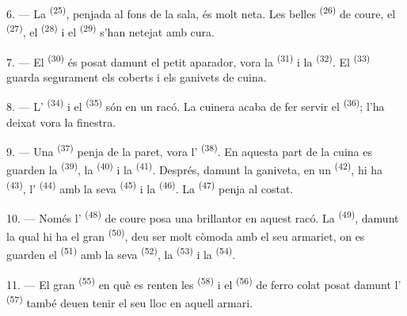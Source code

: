 \VUsaut{4.0mm}
\VUsaut{3.0mm}

6. --- La  \textsuperscript{(25)}, penjada al fons de la sala, és
molt neta. Les belles  \textsuperscript{(26)} de coure, el 
\textsuperscript{(27)}, el  \textsuperscript{(28)} i el 
\textsuperscript{(29)} s'han netejat amb cura.

7. --- El  \textsuperscript{(30)} és posat damunt el petit aparador, vora la
 \textsuperscript{(31)} i la 
\textsuperscript{(32)}. El  \textsuperscript{(33)} guarda segurament els
coberts i els ganivets de cuina.

8. --- L' \textsuperscript{(34)} i el  \textsuperscript{(35)}
són en un racó. La cuinera acaba de fer servir el
 \textsuperscript{(36)}; l'ha deixat vora la finestra.

9. --- Una  \textsuperscript{(37)} penja de la paret, vora
l' \textsuperscript{(38)}. En aquesta part de la cuina es guarden la
 \textsuperscript{(39)}, la  \textsuperscript{(40)}
i la  \textsuperscript{(41)}. Després, damunt la ganiveta, en un
 \textsuperscript{(42)}, hi ha 
\textsuperscript{(43)}, l' \textsuperscript{(44)} amb la seva 
\textsuperscript{(45)} i la
 \textsuperscript{(46)}. La 
\textsuperscript{(47)} penja al costat.

10. --- Només l' \textsuperscript{(48)} de coure posa una brillantor en aquest
racó. La  \textsuperscript{(49)}, damunt la qual hi ha el gran 
\textsuperscript{(50)}, deu ser molt còmoda amb el seu armariet, on es guarden el
 \textsuperscript{(51)} amb la seva 
\textsuperscript{(52)}, la  \textsuperscript{(53)} i la
 \textsuperscript{(54)}.

\VUsaut{4.0mm}
\VUsaut{3.0mm}

11. --- El gran  \textsuperscript{(55)} en què es renten les
 \textsuperscript{(58)} i el 
\textsuperscript{(56)} de ferro colat posat damunt l' \textsuperscript{(57)}
també deuen tenir el seu lloc en aquell armari.

